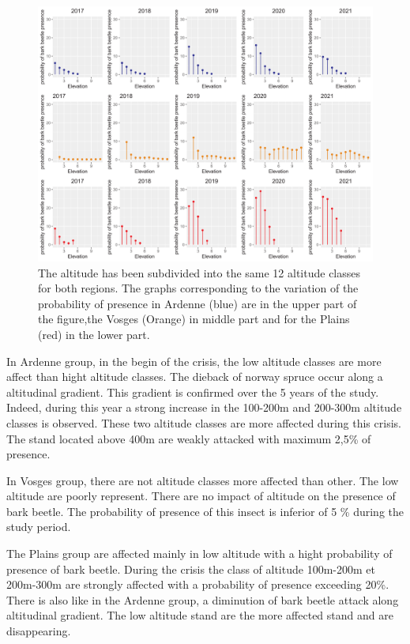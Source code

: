 \documentclass[3p,procedia]{elsarticle}
\begin{document}
\begin{figure}
\centering
	\includegraphics[width=\textwidth]{synthese_color_06_2022.png}
     \caption{The altitude has been subdivided into the same 12 altitude classes for both regions. 
The graphs corresponding to the variation of the probability of presence in Ardenne (blue) are in the upper part of the figure,the Vosges (Orange) in middle part and for the Plains (red) in the lower part.
}
	\label{alti_sco}
\end{figure}

In Ardenne group, in the begin of the crisis, the low altitude classes are more affect than hight altitude classes.
The dieback of norway spruce occur along a altitudinal  gradient.
This gradient is confirmed over the 5 years of the study.
Indeed, during this year a strong increase in the 100-200m and 200-300m altitude classes is observed. 
These two altitude classes are more affected during this crisis.
The stand located above 400m are weakly attacked with maximum 2,5\% of presence.

In Vosges group, there are not altitude classes more affected than other. 
The low altitude are poorly represent. There are no impact of altitude on the presence of bark beetle. 
The probability of presence of this insect is inferior of 5 \% during the study period.

The Plains group are affected mainly in low altitude with a hight probability of presence of bark beetle. 
During the crisis the class of altitude 100m-200m et 200m-300m are strongly affected with a probability of presence exceeding 20\%.
There is also like in the Ardenne group, a diminution of bark beetle attack along altitudinal gradient.
The low altitude stand are the more affected stand and are disappearing.
\end{document}
